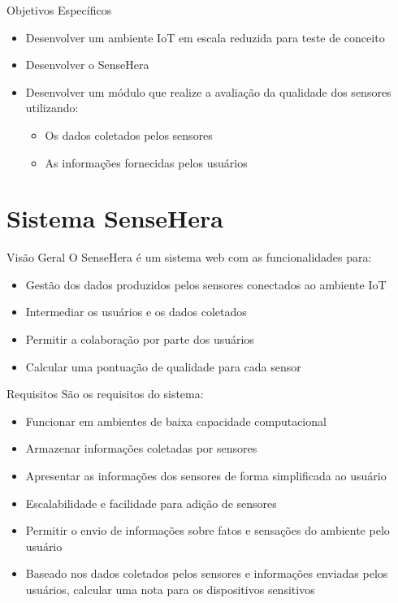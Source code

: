 \documentclass{beamer}
\begin{document}
    \begin{frame}{Objetivos Específicos}
      \begin{itemize}
          \item Desenvolver um ambiente IoT em escala reduzida para teste de conceito
          \item Desenvolver o SenseHera
          \item Desenvolver um módulo que realize a avaliação da qualidade dos sensores utilizando:
            \begin{itemize}
              \item Os dados coletados pelos sensores
              \item As informações fornecidas pelos usuários
            \end{itemize}
      \end{itemize}
    \end{frame}

  \section{Sistema SenseHera}
  \begin{frame}{Visão Geral}
    \quad O SenseHera é um sistema web com as funcionalidades para:
    \begin{itemize}
      \item Gestão dos dados produzidos pelos sensores conectados ao ambiente IoT
      \item Intermediar os usuários e os dados coletados
      \item Permitir a colaboração por parte dos usuários
      \item Calcular uma pontuação de qualidade para cada sensor
    \end{itemize}
  \end{frame}

  \begin{frame}{Requisitos}
    \quad São os requisitos do sistema:
    \begin{itemize}
      \item Funcionar em ambientes de baixa capacidade computacional
      \item Armazenar informações coletadas por sensores
      \item Apresentar as informações dos sensores de forma simplificada ao usuário
      \item Escalabilidade e facilidade para adição de sensores
      \item Permitir o envio de informações sobre fatos e sensações do ambiente pelo usuário
      \item Baseado nos dados coletados pelos sensores e informações enviadas pelos usuários, calcular uma nota para os dispositivos sensitivos
    \end{itemize}
  \end{frame}
\end{document}
